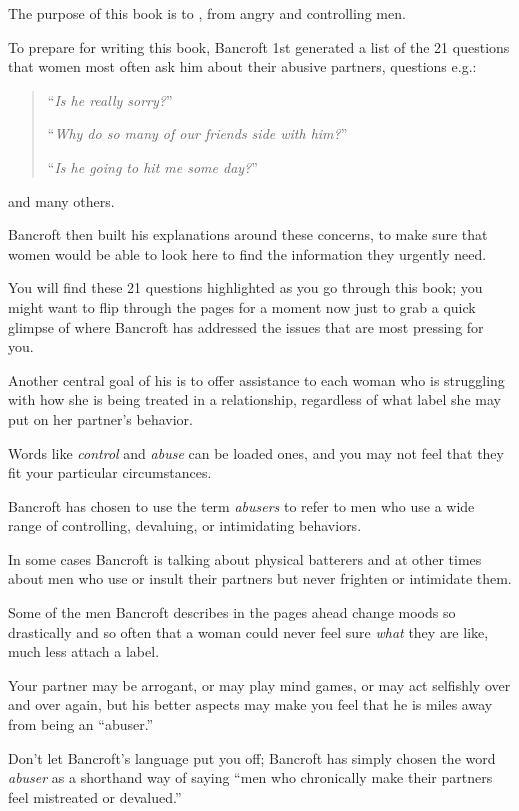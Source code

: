 \documentclass[oneside]{article}
\numberwithin{equation}{section}
\begin{document}
The purpose of this book is to , from angry and controlling men.

%
To prepare for writing this book, Bancroft 1st generated a list of the 21 questions that women most often ask him about their abusive partners, questions e.g.:
\begin{quotation}
    ``\textit{Is he really sorry?}''
    
    ``\textit{Why do so many of our friends side with him?}''
    
    ``\textit{Is he going to hit me some day?}''
\end{quotation}
and many others.

Bancroft then built his explanations around these concerns, to make sure that women would be able to look here to find the information they urgently need.

You will find these 21 questions highlighted as you go through this book; you might want to flip through the pages for a moment now just to grab a quick glimpse of where Bancroft has addressed the issues that are most pressing for you.

%
Another central goal of his is to offer assistance to each woman who is struggling with how she is being treated in a relationship, regardless of what label she may put on her partner's behavior.

Words like \textit{control} and \textit{abuse} can be loaded ones, and you may not feel that they fit your particular circumstances.

Bancroft has chosen to use the term \textit{abusers} to refer to men who use a wide range of controlling, devaluing, or intimidating behaviors.

In some cases Bancroft is talking about physical batterers and at other times about men who use or insult their partners but never frighten or intimidate them.

Some of the men Bancroft describes in the pages ahead change moods so drastically and so often that a woman could never feel sure \textit{what} they are like, much less attach a label.

Your partner may be arrogant, or may play mind games, or may act selfishly over and over again, but his better aspects may make you feel that he is miles away from being an ``abuser.''

Don't let Bancroft's language put you off; Bancroft has simply chosen the word \textit{abuser} as a shorthand way of saying ``men who chronically make their partners feel mistreated or devalued.''
\end{document}
